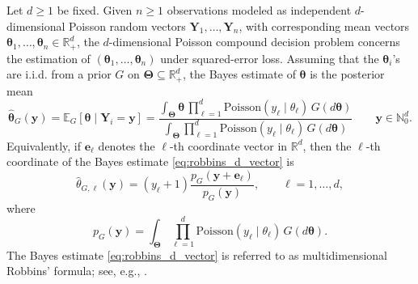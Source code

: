\documentclass[twoside,12pt]{article}
\newcommand{\E}{\mathds{E}}
\begin{document}
Let $d\geq1$ be fixed. Given $n\geq1$ observations modeled as independent $d$-dimensional Poisson random vectors $\boldsymbol Y_1,\ldots,\boldsymbol Y_n$, with corresponding mean vectors $\boldsymbol\theta_1,\ldots,\boldsymbol\theta_n\in\mathbb R_+^d$, the $d$-dimensional Poisson compound decision problem concerns the estimation of $(\boldsymbol\theta_1,\ldots,\boldsymbol\theta_n)$ under squared-error loss. Assuming that the $\boldsymbol\theta_i$'s are i.i.d. from a prior $G$ on $\boldsymbol{\Theta}\subseteq\mathbb R_+^d$, the Bayes estimate of $\boldsymbol\theta$ is the posterior mean
\begin{equation}\label{eq:robbins_d_vector}
\hat{\boldsymbol\theta}_{G}(\boldsymbol y)=\E_{G}[\boldsymbol\theta\mid \boldsymbol Y_{i}=\boldsymbol y]=\frac{\int_{\boldsymbol{\Theta}}\boldsymbol\theta\, \prod_{\ell=1}^{d}\text{Poisson}(y_{\ell}\mid\theta_{\ell})\,G(d\boldsymbol\theta)}{\int_{\boldsymbol{\Theta}}\prod_{\ell=1}^{d}\text{Poisson}(y_{\ell}\mid\theta_{\ell})\,G(d\boldsymbol\theta)}\qquad\boldsymbol y\in\mathbb N_0^d.
\end{equation}
Equivalently, if $\boldsymbol e_\ell$ denotes the $\ell$-th coordinate vector in $\mathbb R^d$, then the $\ell$-th coordinate of the Bayes estimate \eqref{eq:robbins_d_vector} is
\begin{displaymath}
\hat\theta_{G,\ell}(\boldsymbol y)=(y_\ell+1)\frac{p_G(\boldsymbol y+\boldsymbol e_\ell)}{p_G(\boldsymbol y)},\qquad \ell=1,\ldots,d,
\end{displaymath}
where
\begin{displaymath}
p_{G}(\boldsymbol y)=\int_{\boldsymbol{\Theta}}\prod_{\ell=1}^{d}\text{Poisson}(y_{\ell}\mid\theta_{\ell})\,G(d\boldsymbol\theta).
\end{displaymath}
The Bayes estimate \eqref{eq:robbins_d_vector} is referred to as multidimensional Robbins' formula; see, e.g., \citet{Bro(85)}.
\end{document}
